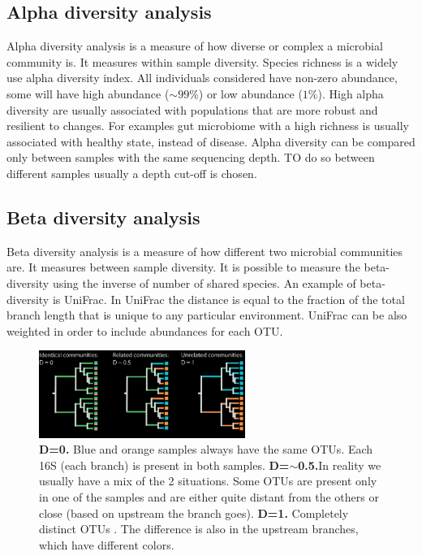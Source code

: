   \subsection{Alpha diversity analysis}
  Alpha diversity analysis is a measure of how diverse or complex a microbial community is.
  It measures within sample diversity.
  Species richness is a widely use alpha diversity index.
  All individuals considered have non-zero abundance, some will have high abundance ($\sim99\%$) or low abundance ($1\%$).
  High alpha diversity are usually associated with populations that are more robust and resilient to changes.
  For examples gut microbiome with a high richness is usually associated with healthy state, instead of disease.
  Alpha diversity can be compared only between samples with the same sequencing depth.
  TO do so between different samples usually a depth cut-off is chosen.

  \subsection{Beta diversity analysis}
  Beta diversity analysis is a measure of how different two microbial communities are.
  It measures between sample diversity.
  It is possible to measure the beta-diversity using the inverse of number of shared species.
  An example of beta-diversity is UniFrac.
  In UniFrac the distance is equal to the fraction of the total branch length that is unique to any particular environment.
  UniFrac can be also weighted in order to include abundances for each OTU.

  \begin{figure}[h]
    \centering
    \includegraphics[width=0.6\textwidth]{UniFrac.png}
    \caption{\textbf{D=0.} Blue and orange samples always have the same OTUs. Each 16S (each branch) is present in both samples. \textbf{D=$\sim$0.5.}In reality we usually have a mix of the 2 situations. Some OTUs are present only in one of the samples and are either quite distant from the others or close (based on upstream the branch goes). \textbf{D=1.} Completely distinct OTUs . The difference is also in the upstream branches, which have different colors.}
  \end{figure}

